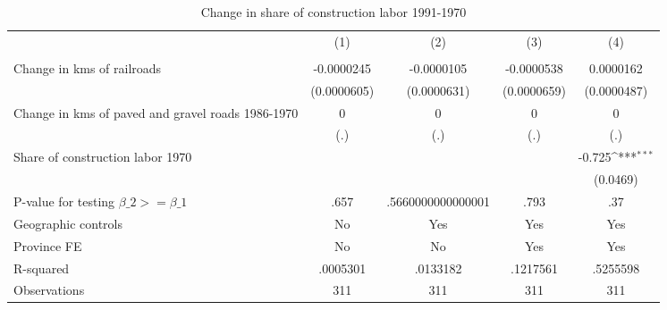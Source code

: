 \begin{table}[htbp]\centering
\def\sym#1{\ifmmode^{#1}\else\(^{#1}\)\fi}
\caption{Change in share of construction labor 1991-1970}
\begin{tabular}{l*{4}{c}}
\hline\hline
                &\multicolumn{1}{c}{(1)}&\multicolumn{1}{c}{(2)}&\multicolumn{1}{c}{(3)}&\multicolumn{1}{c}{(4)}\\
                &\multicolumn{1}{c}{}&\multicolumn{1}{c}{}&\multicolumn{1}{c}{}&\multicolumn{1}{c}{}\\
\hline
Change in kms of railroads&-0.0000245         &-0.0000105         &-0.0000538         &0.0000162         \\
                &(0.0000605)         &(0.0000631)         &(0.0000659)         &(0.0000487)         \\
[1em]
Change in kms of paved and gravel roads 1986-1970&        0         &        0         &        0         &        0         \\
                &      (.)         &      (.)         &      (.)         &      (.)         \\
[1em]
Share of construction labor 1970&                  &                  &                  &   -0.725\sym{***}\\
                &                  &                  &                  & (0.0469)         \\
\hline
P-value for testing $\beta\_{2} >= \beta\_{1}$&     .657         &.5660000000000001         &     .793         &      .37         \\
Geographic controls&       No         &      Yes         &      Yes         &      Yes         \\
Province FE     &       No         &       No         &      Yes         &      Yes         \\
R-squared       & .0005301         & .0133182         & .1217561         & .5255598         \\
Observations    &      311         &      311         &      311         &      311         \\
\hline\hline
\end{tabular}
\end{table}
